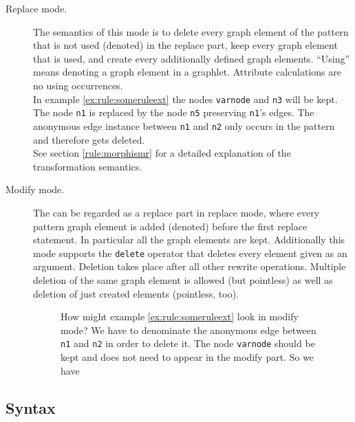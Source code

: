 \begin{description}
  \item[Replace mode.] The semantics of this mode is to delete every graph element of the pattern that is not used (denoted) in the replace part, keep every graph element that is used, and create every additionally defined graph elements. ``Using'' means denoting a graph element in a graphlet. Attribute calculations are no using occurrences.\\
  In example \ref{ex:rule:someruleext} the nodes \texttt{varnode} and \texttt{n3} will be kept. The node \texttt{n1} is replaced by the node \texttt{n5} preserving \texttt{n1}'s edges. The anonymous edge instance between \texttt{n1} and \texttt{n2} only occurs in the pattern and therefore gets deleted.\\
See section \ref{rule:morphismr} for a detailed explanation of the transformation semantics. 
  \item[Modify mode.] The  can be regarded as a replace part in replace mode, where every pattern graph element is added (denoted) before the first replace statement. 
In particular all the  graph elements are kept. 
Additionally this mode supports the \texttt{delete} operator that deletes every element given as an argument. 
Deletion takes place after all other rewrite operations. Multiple deletion of the same graph element is allowed (but pointless) as well as deletion of just created elements (pointless, too).
\begin{figure}[htbp]
\begin{example}
How might example \ref{ex:rule:someruleext} look in modify mode? 
We have to denominate the anonymous edge between \texttt{n1} and \texttt{n2} in order to delete it. 
The node \texttt{varnode} should be kept and does not need to appear in the modify part. 
So we have
\begin{grgen}
rule SomeRuleExtModify(varnode: Node): (Node, EdgeTypeB)  {
  pattern {
    ...
    n1 -e0:Edge-> n2;
    ...
  }
  modify {
    n5 : NodeTypeC<n1>;
    n3 -e1:EdgeTypeB-> n5;
    delete(e0);
    eval {
      ...
\end{grgen}
\end{example}
\end{figure}
\end{description}

\subsection{Syntax}

